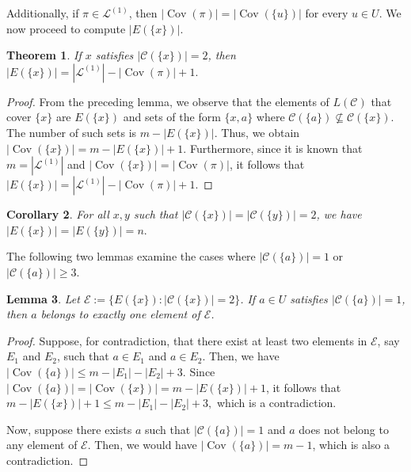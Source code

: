 \documentclass{article}
\newtheorem{theorem}{Theorem}[section]
\newtheorem{lemma}[theorem]{Lemma}
\newtheorem{corollary}[theorem]{Corollary}
\begin{document}
Additionally, if \( \pi \in \mathcal{L}^{(1)} \), then \( |\operatorname{Cov}(\pi)| = |\operatorname{Cov}(\{u\})| \) for every \( u \in U \). We now proceed to compute \( |E(\{x\})| \).



    \begin{theorem}
    If \( x \) satisfies \( |\mathcal{C}(\{x\})| = 2 \), then 
    $|E(\{x\})| = |\mathcal{L}^{(1)}| - |\operatorname{Cov}(\pi)| + 1.$
    
\end{theorem}

\begin{proof}
    From the preceding lemma, we observe that the elements of \( L(\mathcal{C}) \) that cover \( \{x\} \) are \( E(\{x\}) \) and sets of the form \( \{x,a\} \) where \( \mathcal{C}(\{a\}) \not\subseteq \mathcal{C}(\{x\}) \). The number of such sets is \( m - |E(\{x\})| \). Thus, we obtain 
$    |\operatorname{Cov}(\{x\})| = m - |E(\{x\})| + 1.$
  Furthermore, since it is known that \( m = |\mathcal{L}^{(1)}| \) and \( |\operatorname{Cov}(\{x\})| = |\operatorname{Cov}(\pi)| \), it follows that
    $|E(\{x\})| = |\mathcal{L}^{(1)}| - |\operatorname{Cov}(\pi)| + 1.$

\end{proof}

\begin{corollary}
For all \( x, y \) such that \( |\mathcal{C}(\{x\})| = |\mathcal{C}(\{y\})| = 2 \), we have
    $
    |E(\{x\})| = |E(\{y\})| = n.
    $
\end{corollary}

The following two lemmas examine the cases where \( |\mathcal{C}(\{a\})| = 1 \) or \( |\mathcal{C}(\{a\})| \geq 3 \).

\begin{lemma}
    Let \( \mathcal{E} := \{E(\{x\}) : |\mathcal{C}(\{x\})|=2\} \). If \( a \in U \) satisfies \( |\mathcal{C}(\{a\})| = 1 \), then \( a \) belongs to exactly one element of \( \mathcal{E} \).
\end{lemma}

\begin{proof}
    Suppose, for contradiction, that there exist at least two elements in \( \mathcal{E} \), say \( E_1 \) and \( E_2 \), such that \( a \in E_1 \) and \( a \in E_2 \). Then, we have
    $
    |\operatorname{Cov}(\{a\})| \leq m - |E_1| - |E_2| + 3.
    $
    Since \( |\operatorname{Cov}(\{a\})| = |\operatorname{Cov}(\{x\})| = m - |E(\{x\})| + 1 \), it follows that
    $
    m - |E(\{x\})| + 1 \leq m - |E_1| - |E_2| + 3,
    $
    which is a contradiction.

    Now, suppose there exists \( a \) such that \( |\mathcal{C}(\{a\})| = 1 \) and \( a \) does not belong to any element of \( \mathcal{E} \). Then, we would have \( |\operatorname{Cov}(\{a\})| = m - 1 \), which is also a contradiction.
\end{proof}
\end{document}
